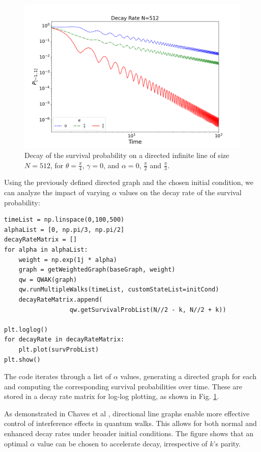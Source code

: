 \documentclass[main.tex]{subfiles}
\begin{document}
\begin{figure}[!h]
    \centering
    \includegraphics[scale=\mysinglefigurescale]{img/QWAK/OrientedDecayRate/decMatrix512NW3_Alpha1.05-1.57S500TMAX100.png}
    \caption{Decay of the survival probability on a directed infinite line of
        size $N=512$, for $\theta =\frac{\pi}{4}$, $\gamma=0$, and $\alpha=0$,
        $\frac{\pi}{2}$ and $\frac{\pi}{3}$.}
    \label{fig:decay_rate_oriented_line}
\end{figure}

Using the previously defined directed graph and the chosen initial condition, we
can analyze the impact of varying $\alpha$ values on the decay rate of the
survival probability:

\begin{lstlisting}[style=code]
timeList = np.linspace(0,100,500)
alphaList = [0, np.pi/3, np.pi/2]
decayRateMatrix = []
for alpha in alphaList:
    weight = np.exp(1j * alpha)
    graph = getWeightedGraph(baseGraph, weight)
    qw = QWAK(graph)
    qw.runMultipleWalks(timeList, customStateList=initCond)
    decayRateMatrix.append(
                  qw.getSurvivalProbList(N//2 - k, N//2 + k))

plt.loglog()
for decayRate in decayRateMatrix:
    plt.plot(survProbList)
plt.show()
\end{lstlisting}

The code iterates through a list of $\alpha$ values, generating a directed
graph for each and computing the corresponding survival probabilities over
time. These are stored in a decay rate matrix for log-log plotting, as shown in
Fig. \ref{fig:decay_rate_oriented_line}.

As demonstrated in Chaves et al \cite{Chaves2023}, directional line graphs
enable more effective control of interference effects in quantum walks. This
allows for both normal and enhanced decay rates under broader initial
conditions. The figure shows that an optimal $\alpha$ value can be chosen to
accelerate decay, irrespective of $k$'s parity.
\end{document}
